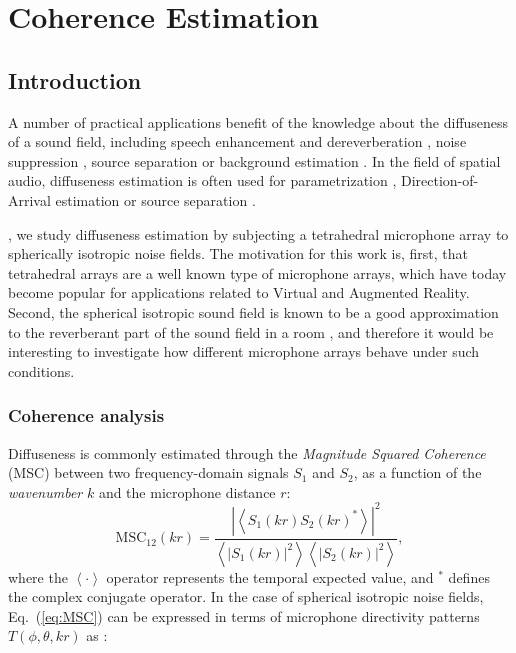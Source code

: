 \chapter{Coherence Estimation}



\section{Introduction}

A number of practical applications benefit of the knowledge about the diffuseness of a sound field, including speech enhancement and dereverberation \cite{p_habets_dual-microphone_2006}, noise suppression \cite{ito_designing_2010}, source separation \cite{duong_under-determined_2009} or background estimation \cite{stefanakis_foreground_2015}. In the field of spatial audio, diffuseness estimation is often used for parametrization \cite{pulkki_directional_2006, politis_compass_2018}, Direction-of-Arrival estimation \cite{thiergart_localization_2009} or source separation \cite{motlicek_real-time_2013}.

, we study diffuseness estimation by subjecting a tetrahedral microphone array to spherically isotropic noise fields.
The motivation for this work is, first, that tetrahedral arrays are a well known type of microphone arrays, which have today become popular for applications related to Virtual and Augmented Reality. 
Second, the spherical isotropic sound field is known to be a good approximation to the reverberant part of the sound field in a room \cite{elko_spatial_2001, mccowan_microphone_2003}, and therefore it would be interesting to investigate how different microphone arrays behave under such conditions.




\subsection{\label{subsec:3:1} Coherence analysis}

Diffuseness is commonly estimated through the
\textit{Magnitude Squared Coherence} (MSC) \cite{elko_spatial_2001} between two frequency-domain signals $S_1$ and $S_2$, as a function of the
\textit{wavenumber} $k$ and the microphone distance $r$:
\begin{equation}
    \text{MSC}_{12}(k r) =
	\frac{|\left\langle S_1(k r) S_2(k r)^* \right\rangle|^2}
	{\left\langle|S_1(k r)|^2\right\rangle \left\langle|S_2(k r)|^2\right\rangle},
    \label{eq:MSC}
\end{equation}
where the $\left\langle \cdot \right\rangle$ operator represents the temporal
expected value, and $^*$ defines the complex conjugate operator. In the case of spherical isotropic noise fields, Eq.~(\ref{eq:MSC})
can be expressed in terms of microphone directivity patterns
$T(\phi,\theta,k r)$ as \cite{elko_spatial_2001}:

